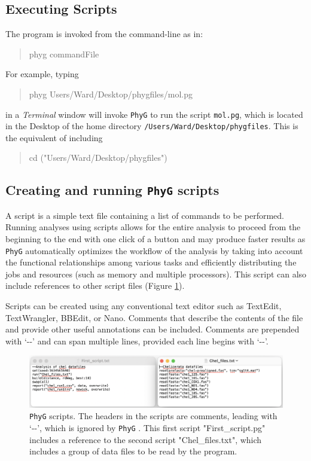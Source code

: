 \documentclass[11pt]{book}
\newcommand{\phyg}{\texttt{PhyG} }
\begin{document}
{{		\subsection{Executing Scripts}
		The program is invoked from the command-line as in:
		
		\begin{quote}
		phyg commandFile
		\end{quote}
		
		\noindent For example, typing\\
		
		\begin{quote}
  		phyg Users/Ward/Desktop/phygfiles/mol.pg
		\end{quote}

		\noindent in a \textit{Terminal} window will invoke \phyg to run the script \texttt{mol.pg}, 
		which is located in the Desktop of the home directory \texttt{/Users/Ward/Desktop/phygfiles}. 
		This is the equivalent of including\\
		
		\begin{quote}
   		cd ("Users/Ward/Desktop/phygfiles")
		\end{quote}
			
		\subsection{Creating and running \phyg scripts}
		A script is a simple text file containing a list of commands to be performed. Running 
		analyses using scripts allows for the entire analysis to proceed from the beginning to 
		the end with one click of a button and may produce faster results as \phyg automatically 
		optimizes the workflow of the analysis by taking into account the functional relationships 
		among various tasks and efficiently distributing the jobs and resources (such as memory 
		and multiple processors). This script 	can also include references to other script files 
		(Figure \ref{firstscript}).
		
		Scripts can be created using any conventional text editor such as TextEdit, TextWrangler, 
		BBEdit, or Nano. Comments that describe the contents of the file and provide other useful 
		annotations can be included. Comments are prepended with `-{}-' and can span multiple 
		lines, provided each line begins with `-{}-'. 

		\begin{figure}
		\centering
		\includegraphics[width=\textwidth]{First_run.jpg}
		\caption{\phyg scripts. The headers in the scripts are comments, leading with `-{}-', which is 
		ignored by \phyg. This first script "First\_script.pg" includes a reference to the second script
		"Chel\_files.txt", which includes a group of data files to be read by the program.}
		\label{firstscript}
		\end{figure}

}}
\end{document}
